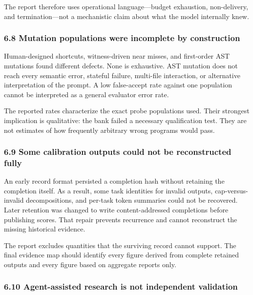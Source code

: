 \documentclass[
]{article}
\begin{document}
The report therefore uses operational language---budget exhaustion,
non-delivery, and termination---not a mechanistic claim about what the
model internally knew.

\subsubsection{6.8 Mutation populations were incomplete by
construction}\label{68-mutation-populations-were-incomplete-by-construction}

Human-designed shortcuts, witness-driven near misses, and first-order
AST mutations found different defects. None is exhaustive. AST mutation
does not reach every semantic error, stateful failure, multi-file
interaction, or alternative interpretation of the prompt. A low
false-accept rate against one population cannot be interpreted as a
general evaluator error rate.

The reported rates characterize the exact probe populations used. Their
strongest implication is qualitative: the bank failed a necessary
qualification test. They are not estimates of how frequently arbitrary
wrong programs would pass.

\subsubsection{6.9 Some calibration outputs could not be reconstructed
fully}\label{69-some-calibration-outputs-could-not-be-reconstructed-fully}

An early record format persisted a completion hash without retaining the
completion itself. As a result, some task identities for invalid
outputs, cap-versus-invalid decompositions, and per-task token summaries
could not be recovered. Later retention was changed to write
content-addressed completions before publishing scores. That repair
prevents recurrence and cannot reconstruct the missing historical
evidence.

The report excludes quantities that the surviving record cannot support.
The final evidence map should identify every figure derived from
complete retained outputs and every figure based on aggregate reports
only.

\subsubsection{6.10 Agent-assisted research is not independent
validation}\label{610-agent-assisted-research-is-not-independent-validation}
\end{document}
